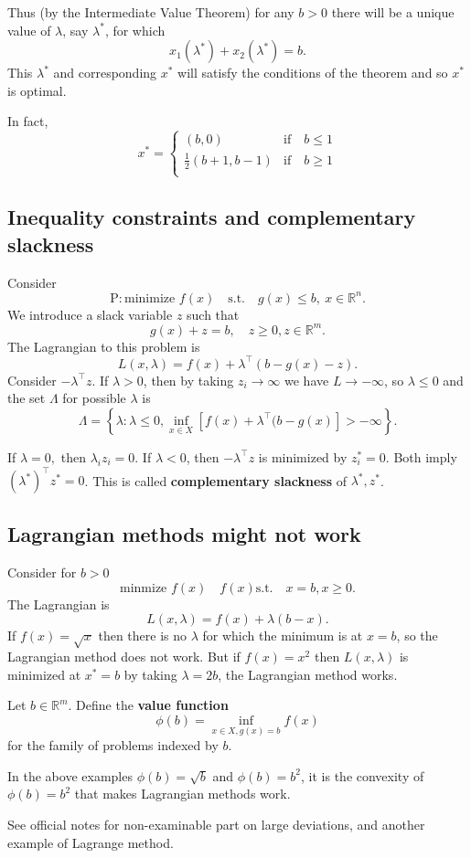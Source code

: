 \begin{example}
    Thus (by the Intermediate Value Theorem) for any $b>0$ there will be a unique value of $\lambda$, say $\lambda^*$, for which
    \[
        x_1\left(\lambda^*\right)+x_2\left(\lambda^*\right)=b.
    \]
    This $\lambda^*$ and corresponding $x^*$ will satisfy the conditions of the theorem and so $x^*$ is optimal.

    In fact,
    \[
        x^* = \begin{cases}
        (b,0) &\text{if}\quad b\le 1\\
        \frac{1}{2}(b+1, b-1) &\text{if}\quad b\ge 1\\
        \end{cases} 
    \]
\end{example}

\subsection{Inequality constraints and complementary slackness}

Consider 
\[
    \mathrm{P}: \text{minimize } f(x) \quad \text{s.t.}\quad g(x)\le b, \ x\in \mathbb{R}^{n}. 
\]
We introduce a slack variable $z$ such that 
\[
    g(x) + z = b,\quad z\ge 0, z\in \mathbb{R}^{m}. 
\]
The Lagrangian to this problem is 
\[
    L(x,\lambda) = f(x) + \lambda^\top (b-g(x)-z). 
\]
Consider $ -\lambda^\top z $. If $ \lambda>0 $, then by taking $ z_i\to \infty  $ we have $ L\to -\infty  $, so $ \lambda\le 0 $ and the set $ \Lambda $ for possible $\lambda$ is
\[
    \Lambda=\left\{\lambda: \lambda \leq 0, \inf _{x \in X}\left[f(x)+\lambda^{\top}(b-g(x)\right]>-\infty\right\}.
\] 

If $ \lambda=0, $ then $ \lambda_i z_i = 0 $. If $ \lambda < 0 $, then $ -\lambda^\top z $ is minimized by $ z^*_i=0 $. Both imply $ (\lambda^*) ^\top z^* =0 $. This is called \textbf{complementary slackness} of $ \lambda^*, z^* $.

\subsection{Lagrangian methods might not work}
\begin{example}
    Consider for $b>0$ 
    \[
        \text{minmize }f(x) \quad f(x) \text{s.t.} \quad x=b,x\ge 0.
    \]
    The Lagrangian is 
    \[
        L(x,\lambda) = f(x) + \lambda(b-x). 
    \]
    If $f(x)=\sqrt{x}$ then there is no $\lambda$ for which the minimum is at $x=b$, so the Lagrangian method does not work. But if $f(x)=x^2$ then $L(x, \lambda)$ is minimized at $x^*=b$ by taking $\lambda=2 b$, the Lagrangian method works.
\end{example}
\begin{definition}
    Let $b \in \mathbb{R}^m$. Define the \textbf{value function}
    \[
    \phi(b)=\inf _{x \in X, g(x)=b} f(x)
    \]
    for the family of problems indexed by $b$.
\end{definition}
In the above examples $\phi(b)=\sqrt{b}$ and $\phi(b)=b^2$, it is the convexity of $\phi(b)=b^2$ that makes Lagrangian methods work.

See official notes for non-examinable part on large deviations, and another example of Lagrange method. 
\newpage